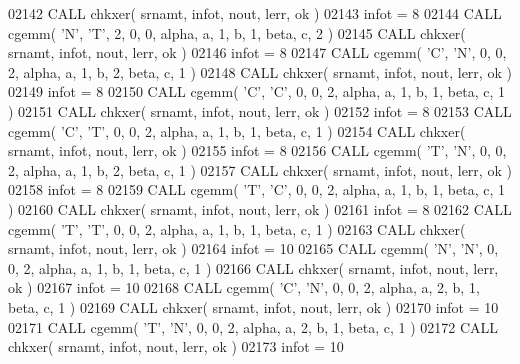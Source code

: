 \begin{DoxyCode}
02142       \textcolor{keyword}{CALL }chkxer( srnamt, infot, nout, lerr, ok )
02143       infot = 8
02144       \textcolor{keyword}{CALL }cgemm( \textcolor{stringliteral}{'N'}, \textcolor{stringliteral}{'T'}, 2, 0, 0, alpha, a, 1, b, 1, beta, c, 2 )
02145       \textcolor{keyword}{CALL }chkxer( srnamt, infot, nout, lerr, ok )
02146       infot = 8
02147       \textcolor{keyword}{CALL }cgemm( \textcolor{stringliteral}{'C'}, \textcolor{stringliteral}{'N'}, 0, 0, 2, alpha, a, 1, b, 2, beta, c, 1 )
02148       \textcolor{keyword}{CALL }chkxer( srnamt, infot, nout, lerr, ok )
02149       infot = 8
02150       \textcolor{keyword}{CALL }cgemm( \textcolor{stringliteral}{'C'}, \textcolor{stringliteral}{'C'}, 0, 0, 2, alpha, a, 1, b, 1, beta, c, 1 )
02151       \textcolor{keyword}{CALL }chkxer( srnamt, infot, nout, lerr, ok )
02152       infot = 8
02153       \textcolor{keyword}{CALL }cgemm( \textcolor{stringliteral}{'C'}, \textcolor{stringliteral}{'T'}, 0, 0, 2, alpha, a, 1, b, 1, beta, c, 1 )
02154       \textcolor{keyword}{CALL }chkxer( srnamt, infot, nout, lerr, ok )
02155       infot = 8
02156       \textcolor{keyword}{CALL }cgemm( \textcolor{stringliteral}{'T'}, \textcolor{stringliteral}{'N'}, 0, 0, 2, alpha, a, 1, b, 2, beta, c, 1 )
02157       \textcolor{keyword}{CALL }chkxer( srnamt, infot, nout, lerr, ok )
02158       infot = 8
02159       \textcolor{keyword}{CALL }cgemm( \textcolor{stringliteral}{'T'}, \textcolor{stringliteral}{'C'}, 0, 0, 2, alpha, a, 1, b, 1, beta, c, 1 )
02160       \textcolor{keyword}{CALL }chkxer( srnamt, infot, nout, lerr, ok )
02161       infot = 8
02162       \textcolor{keyword}{CALL }cgemm( \textcolor{stringliteral}{'T'}, \textcolor{stringliteral}{'T'}, 0, 0, 2, alpha, a, 1, b, 1, beta, c, 1 )
02163       \textcolor{keyword}{CALL }chkxer( srnamt, infot, nout, lerr, ok )
02164       infot = 10
02165       \textcolor{keyword}{CALL }cgemm( \textcolor{stringliteral}{'N'}, \textcolor{stringliteral}{'N'}, 0, 0, 2, alpha, a, 1, b, 1, beta, c, 1 )
02166       \textcolor{keyword}{CALL }chkxer( srnamt, infot, nout, lerr, ok )
02167       infot = 10
02168       \textcolor{keyword}{CALL }cgemm( \textcolor{stringliteral}{'C'}, \textcolor{stringliteral}{'N'}, 0, 0, 2, alpha, a, 2, b, 1, beta, c, 1 )
02169       \textcolor{keyword}{CALL }chkxer( srnamt, infot, nout, lerr, ok )
02170       infot = 10
02171       \textcolor{keyword}{CALL }cgemm( \textcolor{stringliteral}{'T'}, \textcolor{stringliteral}{'N'}, 0, 0, 2, alpha, a, 2, b, 1, beta, c, 1 )
02172       \textcolor{keyword}{CALL }chkxer( srnamt, infot, nout, lerr, ok )
02173       infot = 10

\end{DoxyCode}
